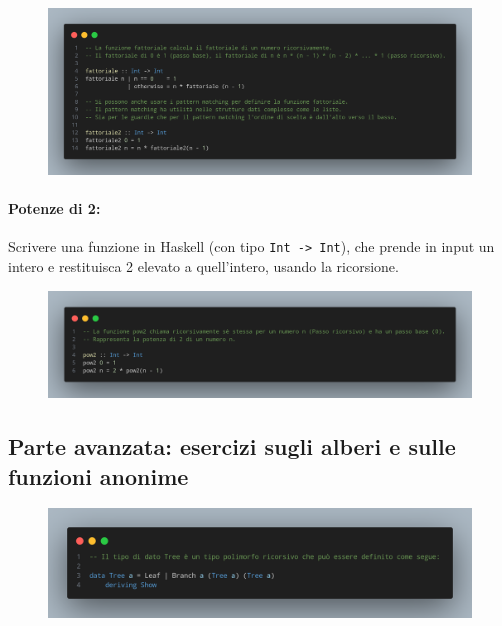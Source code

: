 \begin{figure}[!h]
    \centering
    \includegraphics[width=1\textwidth]{images/Fattoriale2.png}
\end{figure}

\paragraph{Potenze di 2:} Scrivere una funzione in Haskell (con tipo \texttt{Int -> Int}),
che prende in input un intero e restituisca 2 elevato a quell'intero, usando la ricorsione.

\begin{figure}[!h]
    \centering
    \includegraphics[width=1\textwidth]{images/Pow2.png}
\end{figure}

\pagebreak

\subsection{Parte avanzata: esercizi sugli alberi e sulle funzioni anonime}

\begin{figure}[!h]
    \centering
    \includegraphics[width=1\textwidth]{images/Tree.png}
\end{figure}

